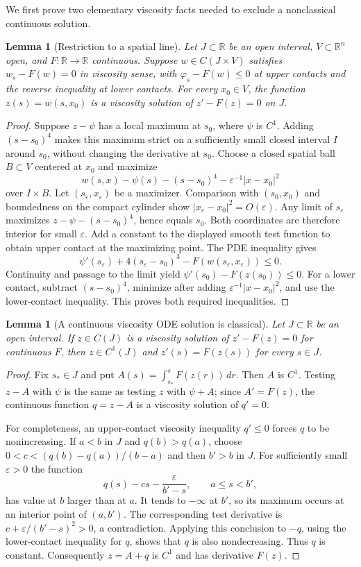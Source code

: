 \documentclass[11pt]{article}
\newtheorem{lemma}[theorem]{Lemma}
\newcommand{\R}{\mathbb R}
\begin{document}
We first prove two elementary viscosity facts needed to exclude a
nonclassical continuous solution.

\begin{lemma}[Restriction to a spatial line]\label{slice}
Let $J\subset\R$ be an open interval, $V\subset\R^n$ open, and $F:\R\to\R$
continuous. Suppose $w\in C(J\times V)$ satisfies $w_s-F(w)=0$ in
viscosity sense, with $\varphi_s-F(w)\leq0$ at upper contacts and the
reverse inequality at lower contacts. For every $x_0\in V$, the function
$z(s)=w(s,x_0)$ is a viscosity solution of $z'-F(z)=0$ on $J$.
\end{lemma}
\begin{proof}
Suppose $z-\psi$ has a local maximum at $s_0$, where $\psi$ is $C^1$.
Adding $(s-s_0)^4$ makes this maximum strict on a sufficiently small
closed interval $I$ around $s_0$, without changing the derivative at $s_0$.
Choose a closed spatial ball $B\subset V$ centered at $x_0$ and maximize
\[
 w(s,x)-\psi(s)-(s-s_0)^4-\varepsilon^{-1}|x-x_0|^2
\]
over $I\times B$. Let $(s_\varepsilon,x_\varepsilon)$ be a maximizer.
Comparison with $(s_0,x_0)$ and boundedness on the compact cylinder show
$|x_\varepsilon-x_0|^2=O(\varepsilon)$. Any limit of $s_\varepsilon$
maximizes $z-\psi-(s-s_0)^4$, hence equals $s_0$. Both coordinates are
therefore interior for small $\varepsilon$. Add a constant to the displayed
smooth test function to obtain upper contact at the maximizing point.
The PDE inequality gives
\[
 \psi'(s_\varepsilon)+4(s_\varepsilon-s_0)^3
       -F(w(s_\varepsilon,x_\varepsilon))\leq0.
\]
Continuity and passage to the limit yield $\psi'(s_0)-F(z(s_0))\leq0$.
For a lower contact, subtract $(s-s_0)^4$, minimize after adding
$\varepsilon^{-1}|x-x_0|^2$, and use the lower-contact inequality.
This proves both required inequalities.
\end{proof}

\begin{lemma}[A continuous viscosity ODE solution is classical]\label{ode}
Let $J\subset\R$ be an open interval. If $z\in C(J)$ is a viscosity solution of $z'-F(z)=0$ for continuous
$F$, then $z\in C^1(J)$ and $z'(s)=F(z(s))$ for every $s\in J$.
\end{lemma}
\begin{proof}
Fix $s_*\in J$ and put $A(s)=\int_{s_*}^sF(z(r))\,dr$.
Then $A$ is $C^1$. Testing $z-A$ with $\psi$ is the same as testing
$z$ with $\psi+A$; since $A'=F(z)$, the continuous function
$q=z-A$ is a viscosity solution of $q'=0$.

For completeness, an upper-contact viscosity inequality $q'\leq0$
forces $q$ to be nonincreasing. If $a<b$ in $J$ and $q(b)>q(a)$,
choose $0<c<(q(b)-q(a))/(b-a)$ and then $b'>b$ in $J$.
For sufficiently small $\varepsilon>0$ the function
\[
 q(s)-cs-\frac{\varepsilon}{b'-s},\qquad a\leq s<b',
\]
has value at $b$ larger than at $a$. It tends to $-\infty$ at $b'$,
so its maximum occurs at an interior point of $(a,b')$.
The corresponding test derivative is
$c+\varepsilon/(b'-s)^2>0$, a contradiction. Applying this conclusion
to $-q$, using the lower-contact inequality for $q$, shows that $q$ is
also nondecreasing. Thus $q$ is constant. Consequently $z=A+q$ is $C^1$
and has derivative $F(z)$.
\end{proof}
\end{document}
